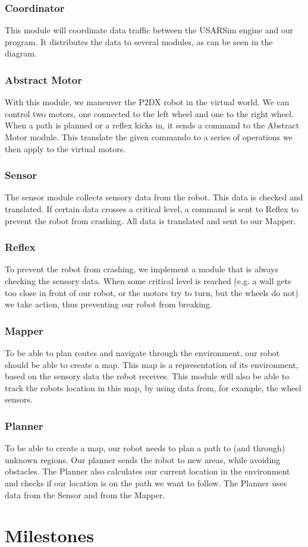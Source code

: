 \documentclass[a4paper, notitlepage]{article}
\begin{document}
\subsubsection{Coordinator}
This module will coordinate data traffic between the USARSim engine and
our program. It distributes the data to several modules, as can be
seen in the diagram.
\subsubsection{Abstract Motor}
With this module, we maneuver the P2DX robot in the virtual world. We
can control two motors, one connected to the left wheel and one to the
right wheel. When a path is planned or a reflex kicks in, it sends a
command to the Abstract Motor module. This translate the given
commando to a series of operations we then apply to the virtual motors.
\subsubsection{Sensor}
The sensor module collects sensory data from the robot. This data is
checked and translated. If certain data crosses a critical level, a
command is sent to Reflex to prevent the robot from crashing. All
data is translated and sent to our Mapper.
\subsubsection{Reflex}
To prevent the robot from crashing, we implement a module that is
always checking the sensory data. When some critical level is reached (e.g. a
wall gets too close in front of our robot, or the motors try to turn, but the
wheels do not) we take action, thus preventing our robot from breaking. 
\subsubsection{Mapper}
To be able to plan routes and navigate through the environment, our robot should
be able to create a map. This map is a representation of its environment, based
on the sensory data the robot receives. This module will also be able to track
the robots location in this map, by using data from, for example, the wheel
sensors.
\subsubsection{Planner}
To be able to create a map, our robot
needs to plan a path to (and through) unknown regions. Our planner sends the
robot to new areas, while avoiding obstacles. The Planner also
calculates our current location in the environment and checks if our
location is on the path we want to follow. The Planner uses data from
the Sensor and from the Mapper.

\section{Milestones}


\end{document}
